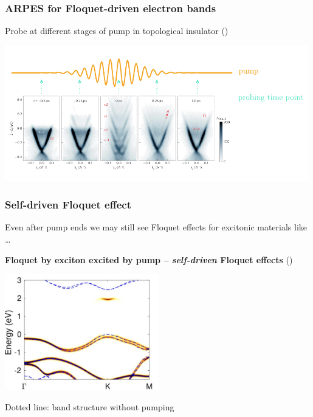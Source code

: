 \documentclass[t]{beamer}
\begin{document}
\begin{frame}
\frametitle{ARPES for Floquet-driven electron bands}

Probe at different stages of pump in topological insulator  (\cite{mahmood2016selective})

\begin{center}
    \includegraphics[width=0.99\textwidth]{plot/floquet-pump-relation.pdf}    
\end{center}


\end{frame}

\begin{frame}
\frametitle{Self-driven Floquet effect}

Even after pump ends we may still see Floquet effects for excitonic materials like \dots

\textbf{Floquet by exciton excited by pump -- \emph{self-driven} Floquet effects} (\cite{chan2023})

\begin{center}
    \includegraphics[width=0.5\textwidth]{plot/self-driven-floquet.jpg}
\end{center}

Dotted line: band structure without pumping

\end{frame}
\end{document}
